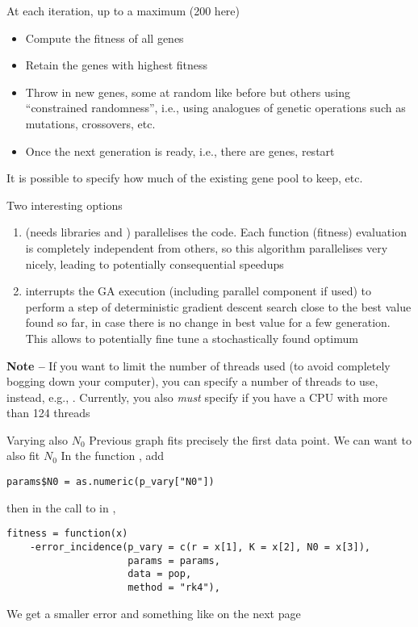 \documentclass[aspectratio=43]{beamer}
\begin{document}
\begin{frame}
At each iteration, up to a maximum  (200 here)
\begin{itemize}
    \item Compute the fitness of all  genes
    \item Retain the genes with highest fitness
    \item Throw in new genes, some at random like before but others using ``constrained randomness'', i.e., using analogues of genetic operations such as mutations, crossovers, etc.
    \item Once the next generation is ready, i.e., there are  genes, restart
\end{itemize}
\vfill
It is possible to specify how much of the existing gene pool to keep, etc.
\end{frame}

\begin{frame}{Two interesting options}
\begin{enumerate}
    \item {} (needs libraries  and ) parallelises the code. Each function (fitness) evaluation is completely independent from others, so this algorithm parallelises very nicely, leading to potentially consequential speedups
    \item {} interrupts the GA execution (including parallel component if used) to perform a step of deterministic gradient descent search close to the best value found so far, in case there is no change in best value for a few generation. This allows to potentially fine tune a stochastically found optimum
\end{enumerate}
\vfill
\textbf{Note --} If you want to limit the number of threads used (to avoid completely bogging down your computer), you can specify a number of threads to use, instead, e.g., . Currently, you also \emph{must} specify  if you have a CPU with more than 124 threads
\end{frame}



\begin{frame}[fragile]{Varying also $N_0$}
    Previous graph fits precisely the first data point. We can want to also fit $N_0$
    \vfill
    In the function , add
\begin{lstlisting}
params$N0 = as.numeric(p_vary["N0"])
\end{lstlisting}
then in the call to  in ,
\begin{lstlisting}
fitness = function(x)
    -error_incidence(p_vary = c(r = x[1], K = x[2], N0 = x[3]),
                     params = params,
                     data = pop,
                     method = "rk4"),
\end{lstlisting}
We get a smaller error and something like on the next page
\end{frame}
\end{document}
